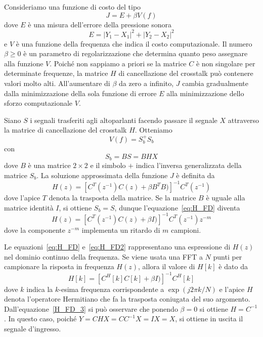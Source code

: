 \documentclass[12pt,a4paper,titlepage]{article}
\begin{document}
Consideriamo una funzione di costo del tipo
\begin{equation}\label{funzione_costo_fd}
J = E + \beta V(f)
\end{equation}
dove $E$ è una misura dell'errore della pressione sonora
\begin{equation}\label{errore_fd}
E = | Y_1 - X_1 |^2  + | Y_2 - X_2 |^2
\end{equation}
e $V$ è una funzione della frequenza che indica il costo computazionale. Il numero $\beta \geq 0$ è un parametro di regolarizzazione che determina quanto peso
assegnare alla funzione $V$. Poiché non sappiamo a priori se la matrice $C$ è non singolare per determinate frequenze, la matrice $H$ di cancellazione del crosstalk può contenere valori molto alti. All'aumentare di $\beta$ da zero a infinito, $J$ cambia gradualmente dalla minimizzazione della sola funzione di errore $E$ alla minimizzazione dello sforzo computazionale $V$.

Siano $S$ i segnali trasferiti agli altoparlanti facendo passare il segnale $X$ attraverso la matrice di cancellazione del crosstalk $H$. Otteniamo
\begin{equation}
V(f) = S_b ^{+} S_b
\end{equation}
con
\begin{equation}
S_b = BS = BHX
\end{equation}
dove $B$ è una matrice $2 \times 2$ e il simbolo $+$ indica l'inversa generalizzata della matrice $S_b$. La soluzione approssimata della funzione $J$ è definita da 
\begin{equation}\label{eq:H_FD}
H(z) = \left[C^T (z^{-1}) C(z) + \beta B^T B)\right]^{-1} C^T(z^{-1})
\end{equation}
dove l'apice $T$ denota la trasposta della matrice. Se la matrice $B$ è uguale alla matrice identità $I$, si ottiene $S_b = S$, dunque l'equazione~\eqref{eq:H_FD} diventa
\begin{equation}\label{eq:H_FD2}
H(z) = \left[C^T (z^{-1}) C(z) + \beta I)\right]^{-1} C^T(z^{-1}) z^{-m}
\end{equation}
dove la componente $z^{-m}$ implementa un ritardo di $m$ campioni.

Le equazioni~\eqref{eq:H_FD} e~\eqref{eq:H_FD2} rappresentano una espressione di $H(z)$ nel dominio continuo della frequenza. Se viene usata una FFT a $N$ punti per campionare la risposta in frequenza $H(z)$, allora il valore di $H[k]$ è dato da
\begin{equation}\label{H_FD_3}
H[k] = \left[C^H[k] C[k] + \beta I)\right]^{-1} C^H[k]
\end{equation}
dove $k$ indica la $k$-esima frequenza corrispondente a $\exp(j2\pi k/N)$ e l'apice $H$ denota l'operatore Hermitiano che fa la trasposta coniugata del suo argomento. Dall'equazione~\eqref{H_FD_3} si può osservare che ponendo $\beta = 0$ si ottiene $H = C^{-1}$. In questo caso, poiché $Y = CHX = C C^{-1} X = IX = X$, si ottiene in uscita il segnale d'ingresso.
\end{document}
